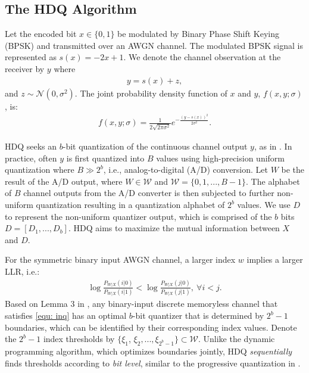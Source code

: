 \documentclass [PhD] {uclathes}
\begin{document}
\subsection{The HDQ Algorithm}
Let the encoded bit $x\in\{0,1\}$ be modulated by Binary Phase Shift Keying (BPSK) and transmitted over an AWGN channel. The modulated BPSK signal is represented as $s(x)=-2x+1$. We denote the channel observation at the receiver by $y$ where
\begin{align}
    y = s(x) +z,
\end{align}
and $z\sim \mathcal{N}(0,\sigma^2)$. The joint probability density function of $x$ and $y$, $f(x,y;\sigma)$, is:
\begin{align}
    f(x,y;\sigma) = \frac{1}{2\sqrt{2\pi \sigma^2}}e^{-\frac{(y-s(x))^2}{2\sigma^2}}.
\end{align}


HDQ seeks an $b$-bit quantization of the continuous channel output $y$, as in \cite{jiadong_softinfo_conf}.  In practice, often $y$ is first quantized into $B$ values using high-precision uniform quantization where $B\gg 2^b$, i.e., analog-to-digital (A/D) conversion.   Let $W$ be the result of the A/D output, where $W\in \mathcal W $ and  ${\mathcal W} =\{0,1,...,B-1\}$. 
The alphabet of $B$ channel outputs from the A/D converter is then subjected to further non-uniform quantization resulting in a quantization alphabet of $2^b$ values. We use $D$ to represent the non-uniform quantizer output, which is comprised of the $b$ bits $ D=[D_1,...,D_b]$.  HDQ aims to maximize the mutual information between $X$ and $D$.

For the symmetric binary input AWGN channel, a larger index $w$ implies a larger LLR, i.e.:
\begin{align}\label{equ: inq}
    \log \frac{P_{W|X}(i|0)}{P_{W|X}(i|1)}<\log \frac{P_{W|X}(j|0)}{P_{W|X}(j|1)},~ \forall i<j.
\end{align}
Based on Lemma 3 in \cite{Kurkoski2014-QuanDMC}, any binary-input discrete memoryless channel that satisfies \eqref{equ: inq} has an optimal $b$-bit quantizer that is determined by $2^b-1$ boundaries, which can be identified by their corresponding index values.  Denote the $2^{b}-1$ index thresholds by $\{\xi_{1}$, $\xi_{2},..., \xi_{2^{b}-1} \} \subset {\mathcal W}$. Unlike the dynamic programming algorithm\cite{Kurkoski2014-QuanDMC}, which optimizes boundaries jointly, HDQ \textit{sequentially} finds thresholds according to \textit{bit level}, similar to the progressive quantization in \cite{nathan-hdq}.
\end{document}

